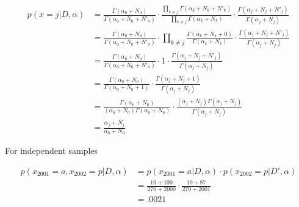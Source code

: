 \documentclass{article}
\begin{document}
\begin{align*}
  p(x=j|D,\alpha) &= \frac{\Gamma(\alpha_0 + N_0)}{\Gamma(\alpha_0 + N_0 + N'_0)}
             \cdot \frac{\prod_{k \neq j} \Gamma(\alpha_k + N_k +
             N'_k)}{\prod_{k \neq j} \Gamma(\alpha_k + N_k)} \cdot
             \frac{\Gamma(\alpha_j + N_j + N'_j)}{\Gamma(\alpha_j +
             N_j)} \\
           &= \frac{\Gamma(\alpha_0 + N_0)}{\Gamma(\alpha_0 + N_0 + N'_0)}
             \cdot \prod_{k \neq j} \frac{\Gamma(\alpha_k + N_k +
             0)}{\Gamma(\alpha_k + N_k)} \cdot \frac{\Gamma(\alpha_j +
             N_j + N'_j)}{\Gamma(\alpha_j + N_j)} \\
           &= \frac{\Gamma(\alpha_0 + N_0)}{\Gamma(\alpha_0 + N_0 + N'_0)}
             \cdot 1 \cdot \frac{\Gamma(\alpha_j +
             N_j + N'_j)}{\Gamma(\alpha_j + N_j)} \\
           &= \frac{\Gamma(\alpha_0 + N_0)}{\Gamma(\alpha_0 + N_0 + 1)}
             \cdot \frac{\Gamma(\alpha_j +
             N_j + 1)}{\Gamma(\alpha_j + N_j)} \\
           &= \frac{\Gamma(\alpha_0 + N_0)}{(\alpha_0 +
             N_0)\Gamma(\alpha_0 + N_0)} \cdot \frac{(\alpha_j +
             N_j)\Gamma(\alpha_j + N_j)}{\Gamma(\alpha_j + N_j)} \\
           &= \frac{\alpha_j + N_j}{\alpha_0 + N_0}
\end{align*}

For independent samples

\begin{align*}
  p(x_{2001}=a, x_{2002}=p|D,\alpha) &= p(x_{2001}=a|D,\alpha)
                                           \cdot
                                           p(x_{2002}=p|D',\alpha)
  \\
                                         &= \frac{10 + 100}{270 +
                                           2000} \cdot \frac{10 +
                                           87}{270 + 2001} \\
                                         &= .0021
\end{align*}
\end{document}
